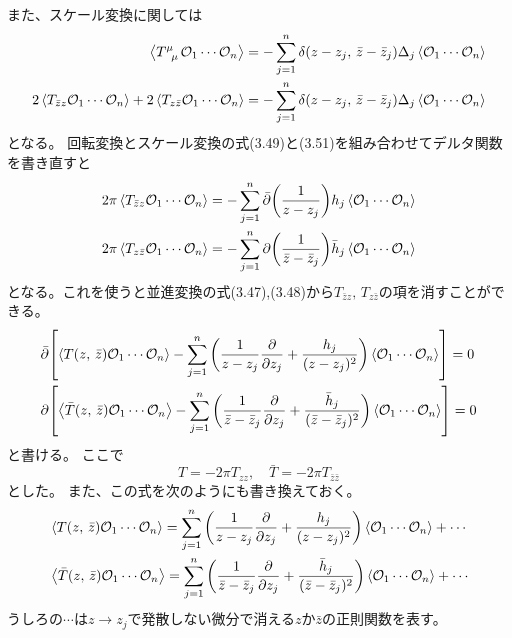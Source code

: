 \documentclass[../../master.tex]{subfiles}
\begin{document}
また、スケール変換に関しては
\begin{align}
    \ev{T\indices{^\mu_\mu}\mathcal{O}_1\cdots\mathcal{O}_n}
    &= - \sum_{j=1}^n \delta(z-z_j,\,\bar{z}-\bar{z}_j)\Delta_j\ev{\mathcal{O}_1\cdots\mathcal{O}_n}\notag\\
    2\ev{T_{\bar{z}z}\mathcal{O}_1\cdots\mathcal{O}_n} + 2\ev{T_{z\bar{z}}\mathcal{O}_1\cdots\mathcal{O}_n}
    &= - \sum_{j=1}^n \delta(z-z_j,\,\bar{z}-\bar{z}_j)\Delta_j\ev{\mathcal{O}_1\cdots\mathcal{O}_n}
\end{align}
となる。
回転変換とスケール変換の式(3.49)と(3.51)を組み合わせてデルタ関数を書き直すと
\begin{align}
    2\pi\ev{T_{\bar{z}z}\mathcal{O}_1\cdots\mathcal{O}_n} = -\sum_{j=1}^{n}\bar{\partial}\qty(\frac{1}{z-z_j})h_j\ev{\mathcal{O}_1\cdots\mathcal{O}_n}\\
    2\pi\ev{T_{z\bar{z}}\mathcal{O}_1\cdots\mathcal{O}_n} = -\sum_{j=1}^{n}\partial\qty(\frac{1}{\bar{z}-\bar{z}_j})\bar{h}_j\ev{\mathcal{O}_1\cdots\mathcal{O}_n}
\end{align}
となる。これを使うと並進変換の式(3.47),(3.48)から\(T_{\bar{z}z},\,T_{z\bar{z}}\)の項を消すことができる。
\begin{align}
    &\bar{\partial}\qty[
        \ev{T(z,\,\bar{z})\mathcal{O}_1\cdots\mathcal{O}_n}-\sum_{j=1}^{n}\qty(
            \frac{1}{z-z_j}\pdv{z_j} + \frac{h_j}{(z-z_j)^2})\ev{\mathcal{O}_1\cdots\mathcal{O}_n}]=0\\
    &\partial\qty[
        \ev{\bar{T}(z,\,\bar{z})\mathcal{O}_1\cdots\mathcal{O}_n}-\sum_{j=1}^{n}\qty(
            \frac{1}{\bar{z}-\bar{z}_j}\pdv{z_j} + \frac{\bar{h}_j}{(\bar{z}-\bar{z}_j)^2})\ev{\mathcal{O}_1\cdots\mathcal{O}_n}]=0
\end{align}
と書ける。
ここで
\begin{equation}
    T = -2\pi T_{zz},\quad \bar{T}=-2\pi T_{\bar{z}\bar{z}}
\end{equation}
とした。
また、この式を次のようにも書き換えておく。
\begin{align}
    &\ev{T(z,\,\bar{z})\mathcal{O}_1\cdots\mathcal{O}_n}=\sum_{j=1}^{n}\qty(
            \frac{1}{z-z_j}\pdv{z_j} + \frac{h_j}{(z-z_j)^2})\ev{\mathcal{O}_1\cdots\mathcal{O}_n}+\cdots\\
    &\ev{\bar{T}(z,\,\bar{z})\mathcal{O}_1\cdots\mathcal{O}_n}=\sum_{j=1}^{n}\qty(
            \frac{1}{\bar{z}-\bar{z}_j}\pdv{z_j} + \frac{\bar{h}_j}{(\bar{z}-\bar{z}_j)^2})\ev{\mathcal{O}_1\cdots\mathcal{O}_n} + \cdots
\end{align}
うしろの\(\cdots\)は\(z\rightarrow z_j\)で発散しない微分で消える\(z\)か\(\bar{z}\)の正則関数を表す。
\end{document}
